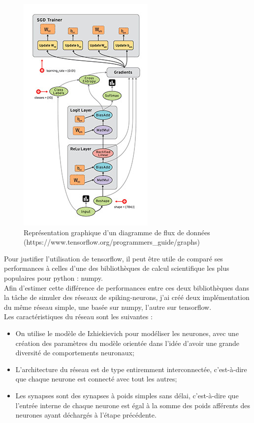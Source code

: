 \documentclass[12pt]{scrartcl}
\begin{document}
\begin{figure}[!h]
\centering
\includegraphics[scale=0.6]{imgs/4.jpg}
\caption{Représentation graphique d'un diagramme de flux de données \scriptsize{(https://www.tensorflow.org/programmers\_guide/graphs)}}
\label{synapse}
\end{figure}

Pour justifier l'utilisation de tensorflow, il peut être utile de comparé ses performances à celles d'une des bibliothèques de calcul scientifique les plus populaires pour python : numpy.\\
Afin d'estimer cette différence de performances entre ces deux bibliothèques dans la tâche de simuler des réseaux de spiking-neurons, j'ai créé deux implémentation du même réseau simple, une basée sur numpy, l'autre sur tensorflow. \\

Les caractéristiques du réseau sont les suivantes :
\begin{itemize}
\item On utilise le modèle de Izhiekievich pour modéliser les neurones, avec une création des paramètres du modèle orientée dans l'idée d'avoir une grande diversité de comportements neuronaux;
\item L'architecture du réseau est de type entiremment interconnectée, c'est-à-dire que chaque neurone est connecté avec tout les autres;
\item Les synapses sont des synapses à poids simples sans délai, c'est-à-dire que l'entrée interne de chaque neurone est égal à la somme des poids afférents des neurones ayant déchargés à l'étape précédente.
\end{itemize}
\end{document}

